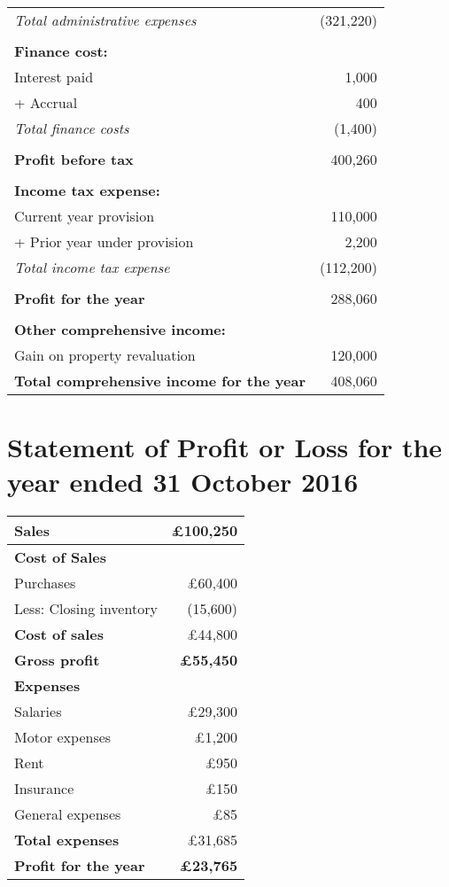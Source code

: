 \begin{center}
\begin{tabular}{@{}l r@{}}
\quad \textit{Total administrative expenses} & (321,220) \\
\\[-6pt]
\textbf{Finance cost:} & \\
\quad Interest paid & 1,000 \\
\quad + Accrual & 400 \\
\quad \textit{Total finance costs} & (1,400) \\
\\[-6pt]
\textbf{Profit before tax} & 400,260 \\
\\[-6pt]
\textbf{Income tax expense:} & \\
\quad Current year provision & 110,000 \\
\quad + Prior year under provision & 2,200 \\
\quad \textit{Total income tax expense} & (112,200) \\
\\[-6pt]
\textbf{Profit for the year} & 288,060 \\
\\[-6pt]
\textbf{Other comprehensive income:} & \\
\quad Gain on property revaluation & 120,000 \\
\textbf{Total comprehensive income for the year} & 408,060 \\
\bottomrule
\end{tabular}

\end{center}
\section*{Statement of Profit or Loss for the year ended 31 October 2016}

\begin{tabular}{@{}l r@{}}
\toprule
Sales & £100{,}250 \\
\midrule
\textbf{Cost of Sales} & \\
\quad Purchases & £60{,}400 \\
\quad Less: Closing inventory & (15{,}600) \\
\textbf{Cost of sales} & £44{,}800 \\
\midrule
\textbf{Gross profit} & \textbf{£55{,}450} \\
\midrule
\textbf{Expenses} & \\
\quad Salaries & £29{,}300 \\
\quad Motor expenses & £1{,}200 \\
\quad Rent & £950 \\
\quad Insurance & £150 \\
\quad General expenses & £85 \\
\textbf{Total expenses} & £31{,}685 \\
\midrule
\textbf{Profit for the year} & \textbf{£23{,}765} \\
\bottomrule
\end{tabular}
